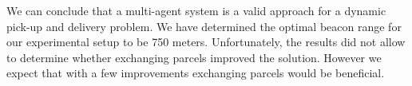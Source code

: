 \documentclass[../main.tex]{subfiles}
\begin{document}
We can conclude that a multi-agent system is a valid approach for a dynamic pick-up and delivery problem. We have determined the optimal beacon range for our experimental setup to be 750 meters. Unfortunately, the results did not allow to determine whether exchanging parcels improved the solution. However we expect that with a few improvements exchanging parcels would be beneficial.
\end{document}
